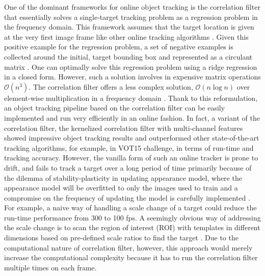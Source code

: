 \documentclass{bmvc2k}
\begin{document}
One of the dominant frameworks for online object tracking is the
correlation filter that essentially solves a single-target tracking
problem as a regression problem in the frequency domain. This
framework assumes that the target location is given at the very first
image frame like other online tracking algorithms
\cite{smeulders2014survey}. Given this positive example for the
regression problem, a set of negative examples is collected around the
initial, target bounding box and represented as a circulant matrix
\cite{henriques2015high}. One can optimally solve this regression
problem using a ridge regression in a closed form. However, such a
solution involves in expensive matrix operations
$\mathcal{O}(n^{3})$. The correlation filter offers a less complex
solution, $\mathcal{O}(n\log n)$ over element-wise multiplication in a
frequency domain \cite{bolme2010visual,henriques2015high}. Thank to
this reformulation, an object tracking pipeline based on the
correlation filter can be easily implemented and run very efficiently
in an online fashion. In fact, a variant of the correlation filter,
the kernelized correlation filter with multi-channel features
\cite{henriques2015high} showed impressive object tracking results and
outperformed other state-of-the-art tracking algorithms, for example,
in VOT15 challenge, in terms of run-time and tracking
accuracy. However, the vanilla form of such an online tracker is prone
to drift, and fails to track a target over a long period of time
primarily \cite{henriques2015high} because of the dilemma of
stability-plasticity in updating appearance model, where the
appearance model will be overfitted to only the images used to train
and a compromise on the frequency of updating the model is carefully
implemented \cite{santner2010prost}. For example, a naive way of
handling a scale change of a target could reduce the run-time
performance from 300 to 100 fps. A seemingly obvious way of addressing
the scale change is to scan the region of interest (ROI) with
templates in different dimensions based on pre-defined scale ratios to
find the target
\cite{henriques2015high,tang2015multi,ma2015long,bibi2015multi,li2014scale}. Due
to the computational nature of correlation filter, however, this
approach would merely increase the computational complexity because it
has to run the correlation filter multiple times on each frame.
\end{document}
